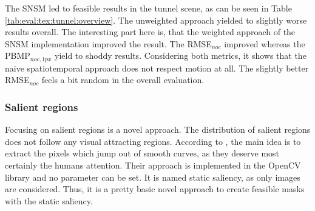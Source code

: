 \noindent The SNSM led to feasible results in the tunnel scene, as can be seen in Table \ref{tab:eval:tex:tunnel:overview}.
The unweighted approach yielded to slightly worse results overall.
The interesting part here is, that the weighted approach of the SNSM implementation improved the result.
The RMSE$_{noc}$ improved whereas the PBMP$_{noc,1px}$ yield to shoddy results.
Considering both metrics, it shows that the naive spatiotemporal approach does not respect motion at all.
The slightly better RMSE$_{noc}$ feels a bit random in the overall evaluation.

\subsubsection{Salient regions}

Focusing on salient regions is a novel approach.
The distribution of salient regions does not follow any visual attracting regions.
According to \citeauthor{hou2007saliency} \citep{hou2007saliency}, the main idea is to extract the pixels which jump out of smooth curves, as they deserve most certainly the humans attention.
Their approach is implemented in the OpenCV library and no parameter can be set.
It is named static saliency, as only images are considered.
Thus, it is a pretty basic novel approach to create feasible masks with the static saliency.

